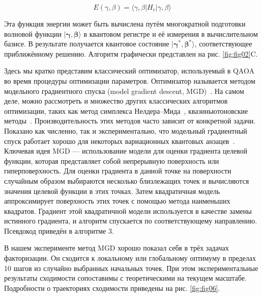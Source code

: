 \begin{equation}
E(\gamma, \beta)
      = \langle \gamma, \beta \lvert H_{c} \rvert \gamma, \beta \rangle
\end{equation}

Эта функция энергии может быть вычислена путём многократной подготовки волновой
функции $\lvert \boldsymbol{\gamma}, \boldsymbol{\beta} \rangle$ в квантовом
регистре и её измерения в вычислительном базисе. В результате получается
квантовое состояние $\lvert \boldsymbol{\gamma}^*, \boldsymbol{\beta}^*
\rangle$, соответствующее приближённому решению. Алгоритм графически
представлен на рис. \ref{fig:fig02}C.

Здесь мы кратко представим классический оптимизатор, используемый в QAOA во
время процедуры оптимизации параметров. Оптимизатор называется методом
модельного градиентного спуска (model gradient descent, MGD)~\cite{cite_48}. На
самом деле, можно рассмотреть и множество других классических алгоритмов
оптимизации, таких как метод симплекса Нелдера–Мида~\cite{cite_49},
квазиньютоновские методы~\cite{cite_50,cite_51}. Производительность этих
методов часто зависит от конкретной задачи. Показано как численно, так и
экспериментально, что модельный градиентный спуск работает хорошо для некоторых
вариационных квантовых анзацев~\cite{cite_11,cite_48}. Ключевая идея MGD —
использование модели для оценки градиента целевой функции, которая представляет
собой непрерывную поверхность или гиперповерхность. Для оценки градиента в
данной точке на поверхности случайным образом выбираются несколько близлежащих
точек и вычисляются значения целевой функции в этих точках. Затем квадратичная
модель аппроксимирует поверхность этих точек с помощью метода наименьших
квадратов. Градиент этой квадратичной модели используется в качестве замены
истинного градиента, и алгоритм спускается по соответствующему направлению.
Псевдокод приведён в алгоритме 3.

В нашем эксперименте метод MGD хорошо показал себя в трёх задачах факторизации.
Он сходится к локальному или глобальному оптимуму в пределах 10 шагов из
случайно выбранных начальных точек. При этом экспериментальные результаты
сходимости сопоставимы с теоретическими на текущем масштабе. Подробности о
траекториях сходимости приведены на рис. \ref{fig:fig06}.

